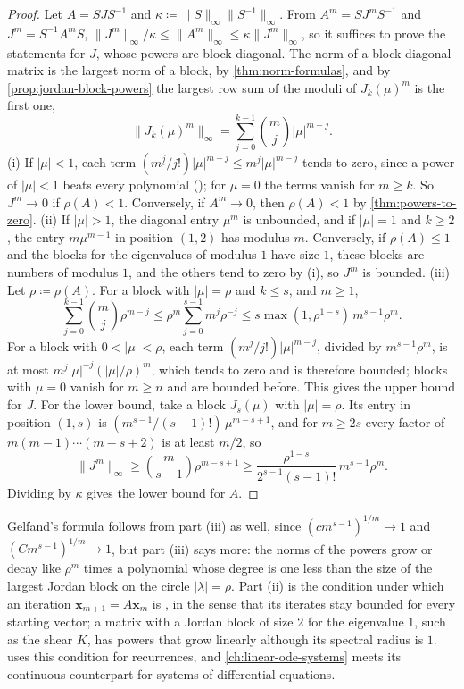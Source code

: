 \begin{proof}
Let $A=SJS^{-1}$ and $\kappa\coloneqq\|S\|_\infty\|S^{-1}\|_\infty$. From $A^m=SJ^mS^{-1}$ and $J^m=S^{-1}A^mS$, $\|J^m\|_\infty/\kappa\le\|A^m\|_\infty\le\kappa\|J^m\|_\infty$, so it suffices to prove the statements for $J$, whose powers are block diagonal. The norm of a block diagonal matrix is the largest norm of a block, by \cref{thm:norm-formulas}, and by \cref{prop:jordan-block-powers} the largest row sum of the moduli of $J_k(\mu)^m$ is the first one,
\[
\|J_k(\mu)^m\|_\infty=\sum_{j=0}^{k-1}\binom mj|\mu|^{m-j}.
\]
(i) If $|\mu|<1$, each term $(m^{\underline j}/j!)|\mu|^{m-j}\le m^j|\mu|^{m-j}$ tends to zero, since a power of $|\mu|<1$ beats every polynomial (); for $\mu=0$ the terms vanish for $m\ge k$. So $J^m\to0$ if $\rho(A)<1$. Conversely, if $A^m\to0$, then $\rho(A)<1$ by \cref{thm:powers-to-zero}. (ii) If $|\mu|>1$, the diagonal entry $\mu^m$ is unbounded, and if $|\mu|=1$ and $k\ge2$, the entry $m\mu^{m-1}$ in position $(1,2)$ has modulus $m$. Conversely, if $\rho(A)\le1$ and the blocks for the eigenvalues of modulus $1$ have size $1$, these blocks are numbers of modulus $1$, and the others tend to zero by (i), so $J^m$ is bounded. (iii) Let $\rho\coloneqq\rho(A)$. For a block with $|\mu|=\rho$ and $k\le s$, and $m\ge1$,
\[
\sum_{j=0}^{k-1}\binom mj\rho^{m-j}\le\rho^m\sum_{j=0}^{s-1}m^j\rho^{-j}\le s\max(1,\rho^{1-s})\,m^{s-1}\rho^m .
\]
For a block with $0<|\mu|<\rho$, each term $(m^{\underline j}/j!)|\mu|^{m-j}$, divided by $m^{s-1}\rho^m$, is at most $m^{j}|\mu|^{-j}(|\mu|/\rho)^m$, which tends to zero and is therefore bounded; blocks with $\mu=0$ vanish for $m\ge n$ and are bounded before. This gives the upper bound for $J$. For the lower bound, take a block $J_s(\mu)$ with $|\mu|=\rho$. Its entry in position $(1,s)$ is $(m^{\underline{s-1}}/(s-1)!)\,\mu^{m-s+1}$, and for $m\ge2s$ every factor of $m(m-1)\cdots(m-s+2)$ is at least $m/2$, so
\[
\|J^m\|_\infty\ge\binom m{s-1}\rho^{m-s+1}\ge\frac{\rho^{1-s}}{2^{s-1}(s-1)!}\,m^{s-1}\rho^m .
\]
Dividing by $\kappa$ gives the lower bound for $A$.
\end{proof}

Gelfand's formula follows from part (iii) as well, since $(cm^{s-1})^{1/m}\to1$ and $(Cm^{s-1})^{1/m}\to1$, but part (iii) says more: the norms of the powers grow or decay like $\rho^m$ times a polynomial whose degree is one less than the size of the largest Jordan block on the circle $|\lambda|=\rho$. Part (ii) is the condition under which an iteration $\mathbf x_{m+1}=A\mathbf x_m$ is , in the sense that its iterates stay bounded for every starting vector; a matrix with a Jordan block of size $2$ for the eigenvalue $1$, such as the shear $K$, has powers that grow linearly although its spectral radius is $1$.  uses this condition for recurrences, and \cref{ch:linear-ode-systems} meets its continuous counterpart for systems of differential equations.


